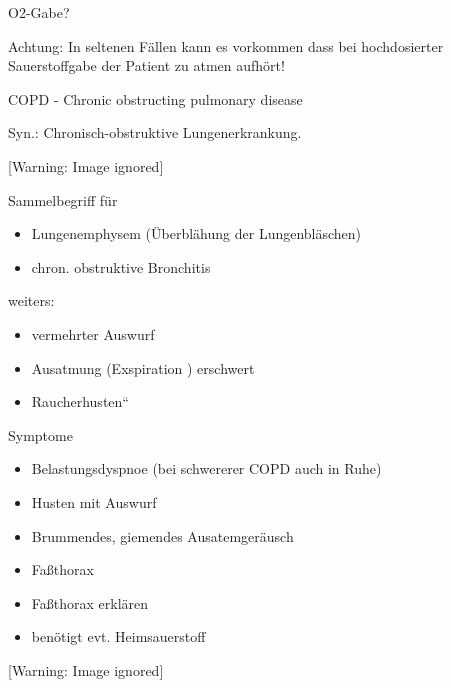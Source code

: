 \documentclass{article}
\makeatletter
\newcommand\captionof[1]{\def\@captype{#1}\caption}
\makeatother
\begin{document}
O2-Gabe?

Achtung: In seltenen F\"allen kann es vorkommen dass bei hochdosierter
Sauerstoffgabe der Patient zu atmen aufh\"ort! 

COPD - Chronic obstructing pulmonary disease

Syn.: Chronisch-obstruktive Lungenerkrankung.

 [Warning: Image ignored] %
\captionof{figure}[Eine COPD entsteht nicht pl\"otzlich: Ein
COPD{\textquotesingle}ler hat eine Karriere hinter sich.]{Eine COPD
entsteht nicht pl\"otzlich: Ein COPD{\textquotesingle}ler hat eine
Karriere hinter sich.}


Sammelbegriff f\"ur

\begin{itemize}
\item Lungenemphysem (\"Uberbl\"ahung der Lungenbl\"aschen)

\item chron. obstruktive Bronchitis

\end{itemize}
weiters:

\begin{itemize}
\item vermehrter Auswurf

\item Ausatmung (Exspiration ) erschwert

\item {\quotedblbase}Raucherhusten{\textquotedblleft}

\end{itemize}
Symptome

\begin{itemize}
\item Belastungsdyspnoe (bei schwererer COPD auch in Ruhe)

\item Husten mit Auswurf

\item Brummendes, giemendes Ausatemger\"ausch

\item Fa{\ss}thorax

\item Fa{\ss}thorax erkl\"aren

\item ben\"otigt evt. Heimsauerstoff

\end{itemize}
  [Warning: Image ignored] %
 
\end{document}

